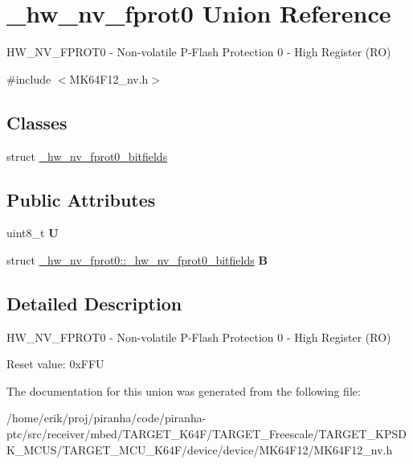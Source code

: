 \hypertarget{union__hw__nv__fprot0}{}\section{\+\_\+hw\+\_\+nv\+\_\+fprot0 Union Reference}
\label{union__hw__nv__fprot0}


H\+W\+\_\+\+N\+V\+\_\+\+F\+P\+R\+O\+T0 -\/ Non-\/volatile P-\/\+Flash Protection 0 -\/ High Register (RO)  




{\ttfamily \#include $<$M\+K64\+F12\+\_\+nv.\+h$>$}

\subsection*{Classes}
\begin{DoxyCompactItemize}
\item 
struct \hyperlink{struct__hw__nv__fprot0_1_1__hw__nv__fprot0__bitfields}{\+\_\+hw\+\_\+nv\+\_\+fprot0\+\_\+bitfields}
\end{DoxyCompactItemize}
\subsection*{Public Attributes}
\begin{DoxyCompactItemize}
\item 
uint8\+\_\+t {\bfseries U}\hypertarget{union__hw__nv__fprot0_a0e0dc37e5b35d51393068fa435a6a18f}{}\label{union__hw__nv__fprot0_a0e0dc37e5b35d51393068fa435a6a18f}

\item 
struct \hyperlink{struct__hw__nv__fprot0_1_1__hw__nv__fprot0__bitfields}{\+\_\+hw\+\_\+nv\+\_\+fprot0\+::\+\_\+hw\+\_\+nv\+\_\+fprot0\+\_\+bitfields} {\bfseries B}\hypertarget{union__hw__nv__fprot0_a96e3d70f885f1142c2663a52149b57b6}{}\label{union__hw__nv__fprot0_a96e3d70f885f1142c2663a52149b57b6}

\end{DoxyCompactItemize}


\subsection{Detailed Description}
H\+W\+\_\+\+N\+V\+\_\+\+F\+P\+R\+O\+T0 -\/ Non-\/volatile P-\/\+Flash Protection 0 -\/ High Register (RO) 

Reset value\+: 0x\+F\+FU 

The documentation for this union was generated from the following file\+:\begin{DoxyCompactItemize}
\item 
/home/erik/proj/piranha/code/piranha-\/ptc/src/receiver/mbed/\+T\+A\+R\+G\+E\+T\+\_\+\+K64\+F/\+T\+A\+R\+G\+E\+T\+\_\+\+Freescale/\+T\+A\+R\+G\+E\+T\+\_\+\+K\+P\+S\+D\+K\+\_\+\+M\+C\+U\+S/\+T\+A\+R\+G\+E\+T\+\_\+\+M\+C\+U\+\_\+\+K64\+F/device/device/\+M\+K64\+F12/M\+K64\+F12\+\_\+nv.\+h\end{DoxyCompactItemize}
